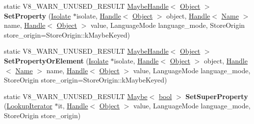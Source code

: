 \begin{DoxyCompactItemize}
\item 
\mbox{\label{classv8_1_1internal_1_1Object_a02853d050e30a67f862d121463ab9c82}} 
static V8\+\_\+\+W\+A\+R\+N\+\_\+\+U\+N\+U\+S\+E\+D\+\_\+\+R\+E\+S\+U\+LT \mbox{\hyperlink{classv8_1_1internal_1_1MaybeHandle}{Maybe\+Handle}}$<$ \mbox{\hyperlink{classv8_1_1internal_1_1Object}{Object}} $>$ {\bfseries Set\+Property} (\mbox{\hyperlink{classv8_1_1internal_1_1Isolate}{Isolate}} $\ast$isolate, \mbox{\hyperlink{classv8_1_1internal_1_1Handle}{Handle}}$<$ \mbox{\hyperlink{classv8_1_1internal_1_1Object}{Object}} $>$ object, \mbox{\hyperlink{classv8_1_1internal_1_1Handle}{Handle}}$<$ \mbox{\hyperlink{classv8_1_1internal_1_1Name}{Name}} $>$ name, \mbox{\hyperlink{classv8_1_1internal_1_1Handle}{Handle}}$<$ \mbox{\hyperlink{classv8_1_1internal_1_1Object}{Object}} $>$ value, Language\+Mode language\+\_\+mode, Store\+Origin store\+\_\+origin=Store\+Origin\+::k\+Maybe\+Keyed)
\item 
\mbox{\label{classv8_1_1internal_1_1Object_ad39cc445b4b85c0c3b7228fe742be3eb}} 
static V8\+\_\+\+W\+A\+R\+N\+\_\+\+U\+N\+U\+S\+E\+D\+\_\+\+R\+E\+S\+U\+LT \mbox{\hyperlink{classv8_1_1internal_1_1MaybeHandle}{Maybe\+Handle}}$<$ \mbox{\hyperlink{classv8_1_1internal_1_1Object}{Object}} $>$ {\bfseries Set\+Property\+Or\+Element} (\mbox{\hyperlink{classv8_1_1internal_1_1Isolate}{Isolate}} $\ast$isolate, \mbox{\hyperlink{classv8_1_1internal_1_1Handle}{Handle}}$<$ \mbox{\hyperlink{classv8_1_1internal_1_1Object}{Object}} $>$ object, \mbox{\hyperlink{classv8_1_1internal_1_1Handle}{Handle}}$<$ \mbox{\hyperlink{classv8_1_1internal_1_1Name}{Name}} $>$ name, \mbox{\hyperlink{classv8_1_1internal_1_1Handle}{Handle}}$<$ \mbox{\hyperlink{classv8_1_1internal_1_1Object}{Object}} $>$ value, Language\+Mode language\+\_\+mode, Store\+Origin store\+\_\+origin=Store\+Origin\+::k\+Maybe\+Keyed)
\item 
\mbox{\label{classv8_1_1internal_1_1Object_acf161b4ed888f56bda7115fb684d0d3f}} 
static V8\+\_\+\+W\+A\+R\+N\+\_\+\+U\+N\+U\+S\+E\+D\+\_\+\+R\+E\+S\+U\+LT \mbox{\hyperlink{classv8_1_1Maybe}{Maybe}}$<$ \mbox{\hyperlink{classbool}{bool}} $>$ {\bfseries Set\+Super\+Property} (\mbox{\hyperlink{classv8_1_1internal_1_1LookupIterator}{Lookup\+Iterator}} $\ast$it, \mbox{\hyperlink{classv8_1_1internal_1_1Handle}{Handle}}$<$ \mbox{\hyperlink{classv8_1_1internal_1_1Object}{Object}} $>$ value, Language\+Mode language\+\_\+mode, Store\+Origin store\+\_\+origin)

\end{DoxyCompactItemize}
